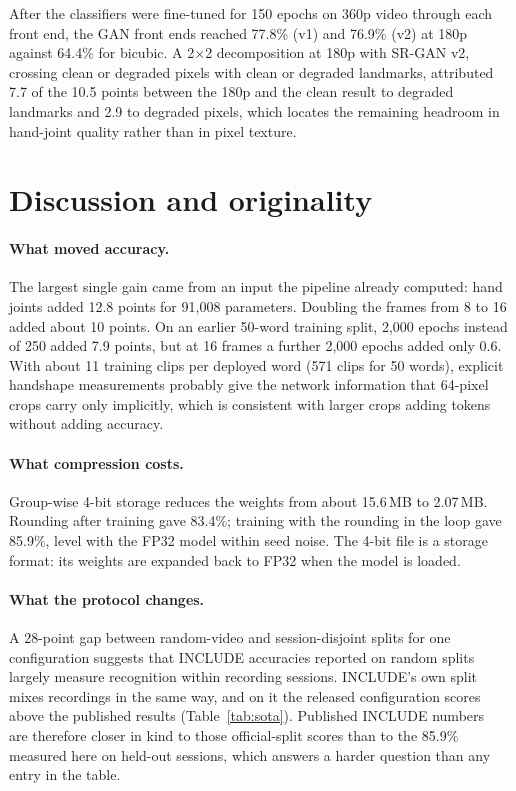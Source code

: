 \documentclass[pdflatex,sn-mathphys-num,twocolumn]{sn-jnl}
\theoremstyle{thmstyleone}%
\begin{document}
After the classifiers were fine-tuned for 150 epochs on 360p video through each front end, the GAN front ends reached 77.8\% (v1) and 76.9\% (v2) at 180p against 64.4\% for bicubic. A 2$\times$2 decomposition at 180p with SR-GAN v2, crossing clean or degraded pixels with clean or degraded landmarks, attributed 7.7 of the 10.5 points between the 180p and the clean result to degraded landmarks and 2.9 to degraded pixels, which locates the remaining headroom in hand-joint quality rather than in pixel texture.

\section{Discussion and originality}\label{sec:discussion}

\paragraph{What moved accuracy.} The largest single gain came from an input the pipeline already computed: hand joints added 12.8 points for 91,008 parameters. Doubling the frames from 8 to 16 added about 10 points. On an earlier 50-word training split, 2,000 epochs instead of 250 added 7.9 points, but at 16 frames a further 2,000 epochs added only 0.6. With about 11 training clips per deployed word (571 clips for 50 words), explicit handshape measurements probably give the network information that 64-pixel crops carry only implicitly, which is consistent with larger crops adding tokens without adding accuracy.

\paragraph{What compression costs.} Group-wise 4-bit storage reduces the weights from about 15.6\,MB to 2.07\,MB. Rounding after training gave 83.4\%; training with the rounding in the loop gave 85.9\%, level with the FP32 model within seed noise. The 4-bit file is a storage format: its weights are expanded back to FP32 when the model is loaded.

\paragraph{What the protocol changes.} A 28-point gap between random-video and session-disjoint splits for one configuration suggests that INCLUDE accuracies reported on random splits largely measure recognition within recording sessions. INCLUDE's own split mixes recordings in the same way, and on it the released configuration scores above the published results (Table~\ref{tab:sota}). Published INCLUDE numbers~\cite{sridhar2020include,selvaraj2022openhands,patra2024hwgat} are therefore closer in kind to those official-split scores than to the 85.9\% measured here on held-out sessions, which answers a harder question than any entry in the table.
\end{document}
